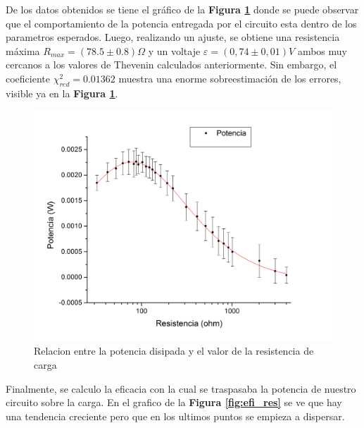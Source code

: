 \documentclass[11pt,a4paper]{article}
\begin{document}
De los datos obtenidos se tiene el gráfico de la \textbf{Figura \ref{fig:pot_res}} donde se puede observar que el comportamiento de la potencia entregada por el circuito esta dentro de los parametros esperados. Luego, realizando un ajuste, se obtiene una resistencia máxima $R_{max} = (78.5 \pm 0.8)\Omega$ y un voltaje $\varepsilon = (0,74\pm 0,01)V$ ambos muy cercanos a los valores de Thevenin calculados anteriormente. Sin embargo, el coeficiente $\chi_{red}^{2} = 0.01362$ muestra una enorme sobreestimación de los errores, visible ya en la \textbf{Figura \ref{fig:pot_res}}.

\begin{figure}[h]
  \centering
  \includegraphics[scale=0.4]{Potencia_vs_Resistencia_2}
  \caption{Relacion entre la potencia disipada y el valor de la resistencia de carga}
  \label{fig:pot_res}
\end{figure}

Finalmente, se calculo la eficacia con la cual se traspasaba la potencia de nuestro circuito sobre la carga. En el grafico de la \textbf{Figura \ref{fig:efi_res}} se ve que hay una tendencia creciente pero que en los ultimos puntos se empieza a dispersar. 
\end{document}
